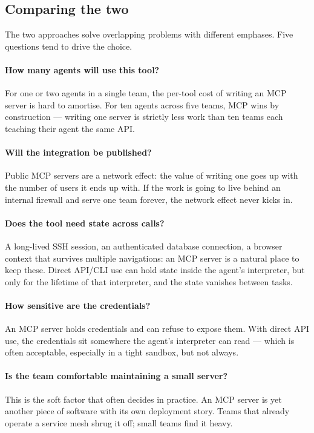 \subsection{Comparing the two}
\label{sec:mcp-compare}

The two approaches solve overlapping problems with different
emphases. Five questions tend to drive the choice.

\paragraph{How many agents will use this tool?}
For one or two agents in a single team, the per-tool cost of
writing an MCP server is hard to amortise. For ten agents across
five teams, MCP wins by construction --- writing one server is
strictly less work than ten teams each teaching their agent the
same API.

\paragraph{Will the integration be published?}
Public MCP servers are a network effect: the value of writing one
goes up with the number of users it ends up with. If the work is
going to live behind an internal firewall and serve one team
forever, the network effect never kicks in.

\paragraph{Does the tool need state across calls?}
A long-lived SSH session, an authenticated database connection, a
browser context that survives multiple navigations: an MCP server
is a natural place to keep these. Direct API/CLI use can hold
state inside the agent's interpreter, but only for the lifetime of
that interpreter, and the state vanishes between tasks.

\paragraph{How sensitive are the credentials?}
An MCP server holds credentials and can refuse to expose them. With
direct API use, the credentials sit somewhere the agent's
interpreter can read --- which is often acceptable, especially in
a tight sandbox, but not always.

\paragraph{Is the team comfortable maintaining a small server?}
This is the soft factor that often decides in practice. An MCP
server is yet another piece of software with its own deployment
story. Teams that already operate a service mesh shrug it off;
small teams find it heavy.


